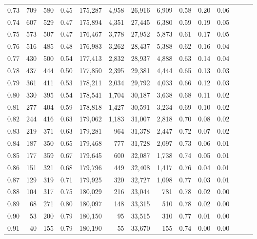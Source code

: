 \begin{tabular}{rrrrrrrrrrrrrr}
0.73 &    709 &  580 &  0.45 &  175,287 &    4,958 &  26,916 &   6,909 &  0.58 &  0.20 &      0.06 \\
0.74 &    607 &  529 &  0.47 &  175,894 &    4,351 &  27,445 &   6,380 &  0.59 &  0.19 &      0.05 \\
0.75 &    573 &  507 &  0.47 &  176,467 &    3,778 &  27,952 &   5,873 &  0.61 &  0.17 &      0.05 \\
0.76 &    516 &  485 &  0.48 &  176,983 &    3,262 &  28,437 &   5,388 &  0.62 &  0.16 &      0.04 \\
0.77 &    430 &  500 &  0.54 &  177,413 &    2,832 &  28,937 &   4,888 &  0.63 &  0.14 &      0.04 \\
0.78 &    437 &  444 &  0.50 &  177,850 &    2,395 &  29,381 &   4,444 &  0.65 &  0.13 &      0.03 \\
0.79 &    361 &  411 &  0.53 &  178,211 &    2,034 &  29,792 &   4,033 &  0.66 &  0.12 &      0.03 \\
0.80 &    330 &  395 &  0.54 &  178,541 &    1,704 &  30,187 &   3,638 &  0.68 &  0.11 &      0.02 \\
0.81 &    277 &  404 &  0.59 &  178,818 &    1,427 &  30,591 &   3,234 &  0.69 &  0.10 &      0.02 \\
0.82 &    244 &  416 &  0.63 &  179,062 &    1,183 &  31,007 &   2,818 &  0.70 &  0.08 &      0.02 \\
0.83 &    219 &  371 &  0.63 &  179,281 &      964 &  31,378 &   2,447 &  0.72 &  0.07 &      0.02 \\
0.84 &    187 &  350 &  0.65 &  179,468 &      777 &  31,728 &   2,097 &  0.73 &  0.06 &      0.01 \\
0.85 &    177 &  359 &  0.67 &  179,645 &      600 &  32,087 &   1,738 &  0.74 &  0.05 &      0.01 \\
0.86 &    151 &  321 &  0.68 &  179,796 &      449 &  32,408 &   1,417 &  0.76 &  0.04 &      0.01 \\
0.87 &    129 &  319 &  0.71 &  179,925 &      320 &  32,727 &   1,098 &  0.77 &  0.03 &      0.01 \\
0.88 &    104 &  317 &  0.75 &  180,029 &      216 &  33,044 &     781 &  0.78 &  0.02 &      0.00 \\
0.89 &     68 &  271 &  0.80 &  180,097 &      148 &  33,315 &     510 &  0.78 &  0.02 &      0.00 \\
0.90 &     53 &  200 &  0.79 &  180,150 &       95 &  33,515 &     310 &  0.77 &  0.01 &      0.00 \\
0.91 &     40 &  155 &  0.79 &  180,190 &       55 &  33,670 &     155 &  0.74 &  0.00 &      0.00 \\

\end{tabular}
